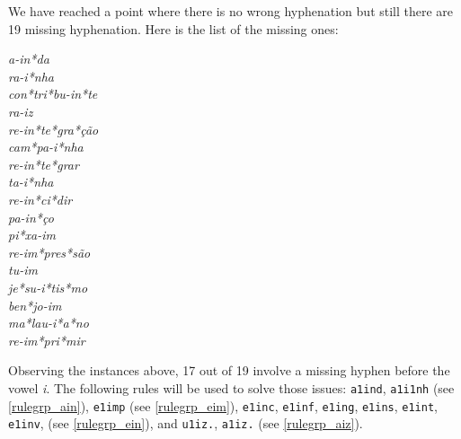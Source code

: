 We have reached a point where there is no wrong hyphenation but still there are 19 missing hyphenation. Here is the list of the missing ones:
\begin{multicols}{5}
\setlength{\columnsep}{0pt}
\setlength{\parindent}{0pt}
\emph{a-in*da \\ ra-i*nha \\ con*tri*bu-in*te \\ ra-iz \\ re-in*te*gra*ção \\ cam*pa-i*nha \\ re-in*te*grar \\ ta-i*nha \\ re-in*ci*dir \\ pa-in*ço \\ pi*xa-im \\ re-im*pres*são \\ tu-im \\ je*su-i*tis*mo \\ ben*jo-im \\ ma*lau-i*a*no \\ re-im*pri*mir}
\end{multicols}
\noindent{}Observing the instances above, 17 out of 19 involve a missing hyphen before the vowel \emph{i}. The following rules
will be used to solve those issues: \texttt{a1ind}, \texttt{a1i1nh} (see \cref{rulegrp_ain}), \texttt{e1imp} (see \cref{rulegrp_eim}), 
\texttt{e1inc}, \texttt{e1inf}, \texttt{e1ing}, \texttt{e1ins}, \texttt{e1int}, \texttt{e1inv}, (see \cref{rulegrp_ein}), 
and \texttt{u1iz.}, \texttt{a1iz.} (see \cref{rulegrp_aiz}).


